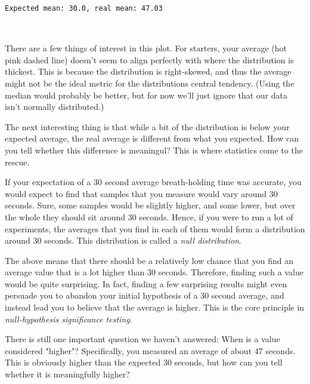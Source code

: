 \documentclass[11pt]{article}
\begin{document}
    \begin{Verbatim}[commandchars=\\\{\}]
Expected mean: 30.0, real mean: 47.03

    \end{Verbatim}

    \begin{center}
    \end{center}
    { \hspace*{\fill} \\}
    
    There are a few things of interest in this plot. For starters, your
average (hot pink dashed line) doesn't seem to align perfectly with
where the distribution is thickest. This is because the distribution is
right-skewed, and thus the average might not be the ideal metric for the
distributions central tendency. (Using the median would probably be
better, but for now we'll just ignore that our data isn't normally
distributed.)

The next interesting thing is that while a bit of the distribution is
below your expected average, the real average is different from what you
expected. How can you tell whether this difference is meaningul? This is
where statistics come to the rescue.

If your expectation of a 30 second average breath-holding time was
accurate, you would expect to find that samples that you measure would
vary around 30 seconds. Sure, some samples would be slightly higher, and
some lower, but over the whole they should sit around 30 seconds. Hence,
if you were to run a lot of experiments, the averages that you find in
each of them would form a distribution around 30 seconds. This
distribution is called a \emph{null distribution}.

The above means that there should be a relatively low chance that you
find an average value that is a lot higher than 30 seconds. Therefore,
finding such a value would be quite surprising. In fact, finding a few
surprising results might even persuade you to abandon your initial
hypothesis of a 30 second average, and instead lead you to believe that
the average is higher. This is the core principle in
\emph{null-hypothesis significance testing}.

There is still one important question we haven't answered: When is a
value considered "higher"? Specifically, you measured an average of
about 47 seconds. This is obviously higher than the expected 30 seconds,
but how can you tell whether it is meaningfully higher?
\end{document}
